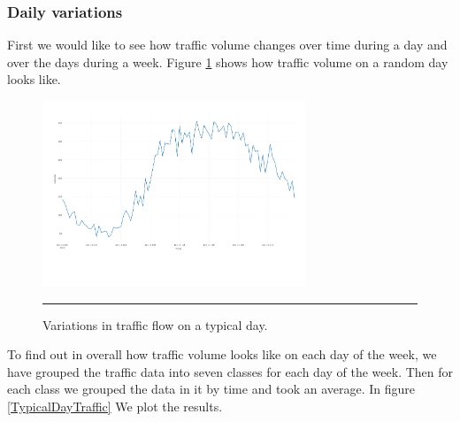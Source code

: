 \subsubsection{Daily variations}
First we would like to see how traffic volume changes over time during a day and over the days during
a week. Figure \ref{fig:TypicalDay} shows how traffic volume on a random day looks like.

\begin{figure}[htbp]
  \centering
    \includegraphics[width=0.7\textwidth,height=0.7\textheight,keepaspectratio]{Plots/typical-day.pdf}
    \rule{35em}{0.5pt}
  \caption[A typical day traffic flow]{Variations in traffic flow on a typical day.}
  \label{fig:TypicalDay}
\end{figure}

To find out in overall how traffic volume looks like on each day of the week, we have grouped the
traffic data into seven classes for each day of the week. Then for each class we grouped the data
in it by time and took an average. In figure \ref{TypicalDayTraffic} We plot the results.


